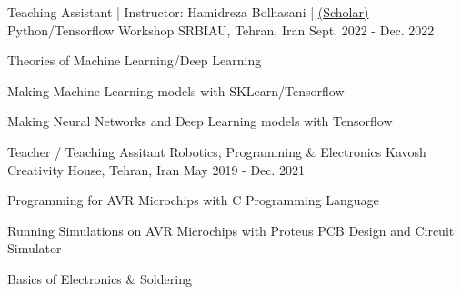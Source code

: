 \begin{cventries}

\cventry
{Teaching Assistant | Instructor: Hamidreza Bolhasani | \href{https://scholar.google.co.in/citations?user=JnHYS6EAAAAJ&hl=en}{(Scholar)}} %
{Python/Tensorflow Workshop} %
{SRBIAU, Tehran, Iran} %
{Sept. 2022 - Dec. 2022} %
{ %
\begin{cvitems}
\item {\vspace{-4.0mm}\fontsize{10}{11}\selectfont Theories of Machine Learning/Deep Learning}
\item {\fontsize{10}{11}\selectfont Making Machine Learning models with SKLearn/Tensorflow}
\item {\fontsize{10}{11}\selectfont Making Neural Networks and Deep Learning models with Tensorflow} 
\end{cvitems} 
}




\cventry
{Teacher / Teaching Assitant} %
{Robotics, Programming \& Electronics} %
{Kavosh Creativity House, Tehran, Iran} %
{May 2019 - Dec. 2021} %
{ %
\begin{cvitems}
\item {\vspace{-4.0mm}\fontsize{10}{11}\selectfont Programming for AVR Microchips with C Programming Language}
\item {\fontsize{10}{11}\selectfont Running Simulations on AVR Microchips with Proteus PCB Design and Circuit Simulator}
\item {\fontsize{10}{11}\selectfont Basics of Electronics \& Soldering}
\end{cvitems}
}


\end{cventries}
